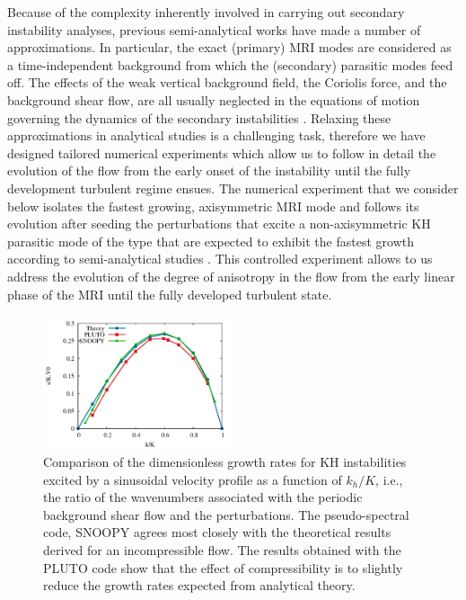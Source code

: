 \documentclass[]{emulateapj}
\begin{document}
Because of the complexity inherently involved in carrying out secondary
instability analyses, previous semi-analytical works have made a
number of approximations.  In particular, the exact (primary) MRI
modes are considered as a time-independent background from which the
(secondary) parasitic modes feed off. The effects of the weak vertical
background field, the Coriolis force, and the background shear flow,
are all usually neglected in the equations of motion governing the
dynamics of the secondary instabilities \citep{Goodman:1994dd,Pessah:2009gm}.  
Relaxing these approximations
in analytical studies is a challenging task, therefore we have
designed tailored numerical experiments which allow us to follow in
detail the evolution of the flow from the early onset of the
instability until the fully development turbulent regime ensues.
The numerical experiment that we consider below isolates the fastest growing, 
axisymmetric MRI mode and follows its evolution after seeding the perturbations
that excite a non-axisymmetric KH parasitic mode of the type that 
are expected to exhibit the fastest growth according to semi-analytical studies
\citet{Pessah:2010ic}. This controlled experiment allows to us address
the evolution of the degree of anisotropy in the flow from the early
linear phase of the MRI until the fully developed turbulent state.


\begin{figure}[t]
\begin{center}
\includegraphics[width=0.5\textwidth]{f1.png}
\caption{
Comparison of the dimensionless growth rates for KH instabilities
excited by a sinusoidal velocity profile as a function of $k_h/K$,
i.e., the ratio of the wavenumbers associated with the periodic background
shear flow and the perturbations.  The pseudo-spectral code, SNOOPY agrees
most closely with the theoretical results derived for an
incompressible flow.  The results obtained with the PLUTO code show
that the effect of compressibility is to slightly reduce the growth
rates expected from analytical theory.}
\label{kh2danalytical_simcomparison}
\end{center}
\end{figure}
\end{document}
